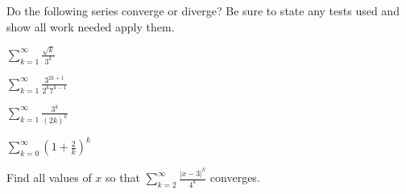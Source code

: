 \documentclass{exam}[12pt]
\begin{document}
\pagestyle{head}

\extraheadheight{.3in}
\extrafootheight{-.3in} 


\vspace{.2in}
\large{

Do the following series converge or diverge? Be sure to state any
tests used and show all work needed apply them.

\begin{questions}

\question $\displaystyle
\sum_{k=1}^\infty \frac{\sqrt{ k}}{3^k } $ 
\vspace{1in}

\question $\displaystyle
\sum_{k=1}^\infty \frac{3^{2k+1}}{2^k 7^{k-1}} $ 
\vspace{1in}


\question $\displaystyle
\sum_{k=1}^\infty \frac{3^k}{(2k)^k} $ 
\vspace{1in}

\question $\displaystyle
\sum_{k=0}^\infty \left(1 + \frac 2 k\right)^k $ 
\vspace{1in}

\question Find all values of $x$ so that $\sum_{k=2}^\infty 
\frac{|x-3|^k}{4^k}$ converges.

\end{questions}

}
\end{document}
